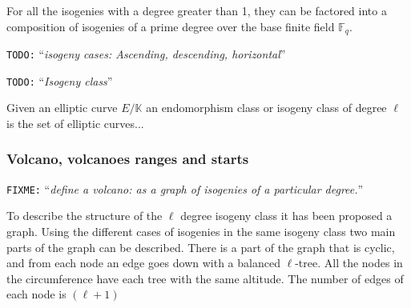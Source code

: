 \documentclass[10pt,a4paper,twoside]{llncs}
\newcommand{\todo}[1]{\texttt{\color{red}TODO:} ``\emph{#1}''}
\newcommand{\fixme}[1]{\texttt{\color{red}FIXME:} ``\emph{#1}''}
\newcommand{\Fq}{\ensuremath{\mathbb{F}_q}}%
\begin{document}
For all the isogenies with a degree greater than 1, they can be factored into a composition of isogenies of a prime degree over the base finite field \Fq.

\todo{isogeny cases: Ascending, descending, horizontal}

\todo{Isogeny class}
\begin{definition}\label{def_iso_class}
 Given an elliptic curve $E/\mathbb{K}$ an endomorphism class or isogeny class of degree $\ell$ is the set of elliptic curves... 
\end{definition}

\subsubsection{Volcano, volcanoes ranges and starts \label{sec:volcano}}

\fixme{define a volcano: as a graph of isogenies of a particular degree.}

To describe the structure of the $\ell$ degree isogeny class it has been proposed a graph. Using the different cases of isogenies in the same isogeny class two main parts of the graph can be described. There is a part of the graph that is cyclic, and from each node an edge goes down with a balanced $\ell$-tree. All the nodes in the circumference have each tree with the same altitude. The number of edges of each node is $(\ell+1)$
\end{document}
